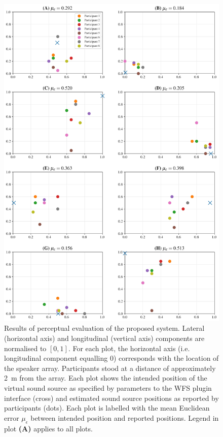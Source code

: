 \documentclass[utf8]{FrontiersinHarvard}
\begin{document}
    \begin{figure}[h!]
        \centering
        \includegraphics[width=.75\textwidth]{figures/subjective}
        \caption{
            Results of perceptual evaluation of the proposed system.
            Lateral (horizontal axis) and longitudinal (vertical axis) components
            are normalised to $[0, 1]$.
            For each plot, the horizontal axis (i.e. longitudinal component
            equalling 0) corresponds with the location of the speaker array.
            Participants stood at a distance of approximately \qty{2}{\m} from
            the array.
            Each plot shows the intended position of the virtual sound source as
            specified by parameters to the WFS plugin interface (cross) and
            estimated sound source positions as reported by participants (dots).
            Each plot is labelled with the mean Euclidean error $\mu_\epsilon$
            between intended position and reported positions.
            Legend in plot \textbf{(A)} applies to all plots.
        }
        \label{fig:perceptual}
    \end{figure}
\end{document}
